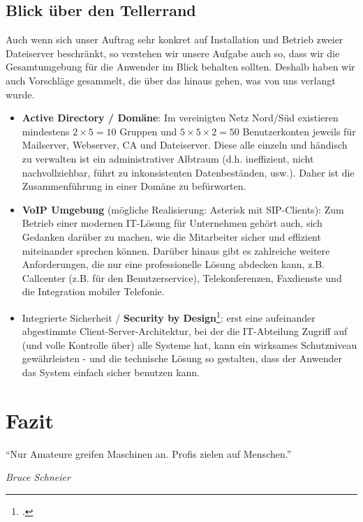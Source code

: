 \subsection{Blick über den Tellerrand}
\label{subsec:tellerrand}
Auch wenn sich unser Auftrag sehr konkret auf Installation und Betrieb zweier Dateiserver beschränkt, so verstehen wir unsere Aufgabe auch so, dass wir die Gesamtumgebung für die Anwender im Blick behalten sollten. Deshalb haben wir auch Vorschläge gesammelt, die über das hinaus gehen, was von uns verlangt wurde.
\begin{itemize}
\item \textbf{Active Directory / Domäne}: Im vereinigten Netz Nord/Süd existieren mindestens $2 \times 5 = 10$ Gruppen und $5 \times 5 \times 2 = 50$ Benutzerkonten jeweils für Mailserver, Webserver, CA und Dateiserver. Diese alle einzeln und händisch zu verwalten ist ein administrativer Albtraum (d.h. ineffizient, nicht nachvollziehbar, führt zu inkonsistenten Datenbeständen, usw.). Daher ist die Zusammenführung in einer Domäne zu befürworten.
\item \textbf{VoIP Umgebung} (mögliche Realisierung: Asterisk mit SIP-Clients): Zum Betrieb einer modernen IT-Lösung für Unternehmen gehört auch, sich Gedanken darüber zu machen, wie die Mitarbeiter sicher und effizient miteinander sprechen können. Darüber hinaus gibt es zahlreiche weitere Anforderungen, die nur eine professionelle Lösung abdecken kann, z.B. Callcenter (z.B. für den Benutzerservice), Telekonferenzen, Faxdienste und die Integration mobiler Telefonie.
\item Integrierte Sicherheit / \textbf{Security by Design}\footcite{waidner2013entwicklung}: erst eine aufeinander abgestimmte Client-Server-Architektur, bei der die IT-Abteilung Zugriff auf (und volle Kontrolle über) alle Systeme hat, kann ein wirksames Schutzniveau gewährleisten - und die technische Lösung so gestalten, dass der Anwender das System einfach sicher benutzen kann.
\end{itemize}
\newpage
\section{Fazit}
\setlength{\epigraphwidth}{.4\textwidth}
\epigraph{"`Nur Amateure greifen Maschinen an. Profis zielen auf Menschen."'}{\textit{Bruce Schneier}}

